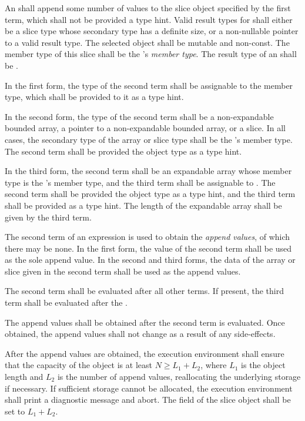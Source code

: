 \specsubsubitem
An  shall append some number of values to the
slice object specified by the first term, which shall not be provided a type
hint. Valid result types for  shall either be a
slice type whose secondary type has a definite size, or a non-nullable pointer
to a valid result type. The selected object shall be mutable and non-const. The
member type of this slice shall be the 's
\textit{member type}. The result type of an 
shall be .

\specsubsubitem
In the first form, the type of the second term shall be assignable to the member
type, which shall be provided to it as a type hint.

\specsubsubitem
In the second form, the type of the second term shall be a non-expandable
bounded array, a pointer to a non-expandable bounded array, or a slice. In all
cases, the secondary type of the array or slice type shall be the
's member type. The second term shall be provided
the object type as a type hint.

\specsubsubitem
In the third form, the second term shall be an expandable array whose member
type is the 's member type, and the third term
shall be assignable to . The second term shall be provided the
object type as a type hint, and the third term shall be provided 
as a type hint. The length of the expandable array shall be given by the third
term.

\specsubsubitem
The second term of an  expression is used to obtain the
\textit{append values}, of which there may be none. In the first form, the
value of the second term shall be used as the sole append value. In the second
and third forms, the data of the array or slice given in the second term shall
be used as the append values.

\specsubsubitem
The second term shall be evaluated after all other terms. If present, the third
term shall be evaluated after the .

\specsubsubitem
The append values shall be obtained after the second term is evaluated. Once
obtained, the append values shall not change as a result of any side-effects.

\specsubsubitem
After the append values are obtained, the execution environment shall ensure
that the capacity of the object is at least $N \geq L_1 + L_2$, where $L_1$ is
the object length and $L_2$ is the number of append values, reallocating the
underlying storage if necessary. If sufficient storage cannot be allocated, the
execution environment shall print a diagnostic message and abort. The
 field of the slice object shall be set to $L_1 + L_2$.

